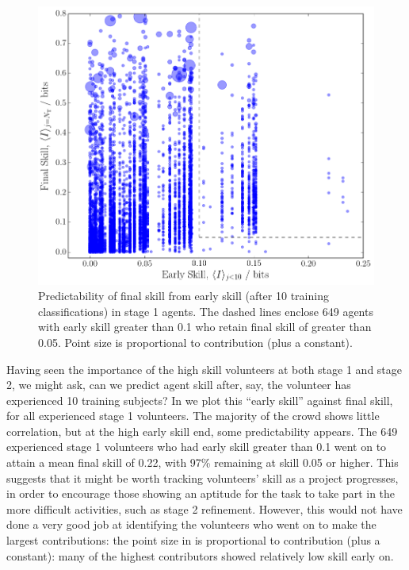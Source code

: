 \documentclass[useAMS,usenatbib,a4paper]{mn2e}
\begin{document}
\begin{figure}
\centering\includegraphics[width=0.9\linewidth]{sw-system-figs/early_vs_final_skill.png}
\caption{Predictability of final skill from early skill (after 10 training
classifications) in stage 1 agents. The dashed lines enclose 649 agents with
early skill greater than 0.1 
who retain final skill of greater than 0.05. Point size is proportional to
contribution (plus a constant).}
\label{fig:crowd:skillprediction}
\end{figure}

Having seen the importance of the high skill volunteers at both stage 1 and
stage 2, we might ask, can we predict agent skill after, say, the volunteer
has experienced 10 training subjects? In  we
plot this ``early skill'' against final skill, for all experienced stage 1
volunteers. The majority of the crowd shows little correlation, but at the
high early skill end, some predictability appears. The 649 experienced  stage
1 volunteers who had early skill greater than 0.1 went on to attain a mean
final skill of 0.22, with 97\% remaining at skill 0.05 or higher. This
suggests that it might be worth tracking volunteers' skill as a project
progresses, in order to encourage those showing an aptitude for the task to
take part in the more difficult activities, such as stage 2 refinement.
However, this would not have done a very good job at identifying the 
volunteers who went on to make the largest contributions: the point size in 
 is proportional to contribution (plus a constant):
many of the highest contributors showed relatively low skill early on.
\end{document}
